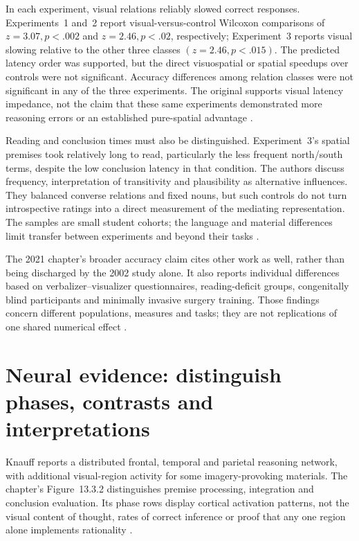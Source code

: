 In each experiment, visual relations reliably slowed correct responses.
Experiments~1 and~2 report visual-versus-control Wilcoxon comparisons of
\(z=3.07,p<.002\) and \(z=2.46,p<.02\), respectively; Experiment~3
reports visual slowing relative to the other three classes
\((z=2.46,p<.015)\).
The predicted latency order was supported, but the direct visuospatial or
spatial speedups over controls were not significant. Accuracy differences
among relation classes were not significant in any of the three experiments.
The original supports visual latency impedance, not the claim that these
same experiments demonstrated more reasoning errors or an established
pure-spatial advantage \parencite[pp.~365--369]{KnauffJohnsonLaird2002VisualImpedance}.

Reading and conclusion times must also be distinguished. Experiment~3's
spatial premises took relatively long to read, particularly the less frequent
north/south terms, despite the low conclusion latency in that condition.
The authors discuss frequency, interpretation of transitivity and plausibility
as alternative influences. They balanced converse relations and fixed nouns,
but such controls do not turn introspective ratings into a direct measurement
of the mediating representation. The samples are small student cohorts;
the language and material differences limit transfer between experiments
and beyond their tasks \parencite[pp.~368--370]{KnauffJohnsonLaird2002VisualImpedance}.

The 2021 chapter's broader accuracy claim cites other work as well, rather
than being discharged by the 2002 study alone. It also reports individual
differences based on verbalizer--visualizer questionnaires, reading-deficit
groups, congenitally blind participants and minimally invasive surgery
training. Those findings concern different populations, measures and tasks;
they are not replications of one shared numerical effect
\parencite[pp.~738--739]{Knauff2021VisualizationRationality}.

\section{Neural evidence: distinguish phases, contrasts and interpretations}
\label{sec:p19-rat133-neural}

Knauff reports a distributed frontal, temporal and parietal reasoning network,
with additional visual-region activity for some imagery-provoking materials.
The chapter's Figure~13.3.2 distinguishes premise processing, integration
and conclusion evaluation. Its phase rows display cortical activation patterns,
not the visual content of thought, rates of correct inference or proof that
any one region alone implements rationality
\parencite[pp.~739--740]{Knauff2021VisualizationRationality}.


